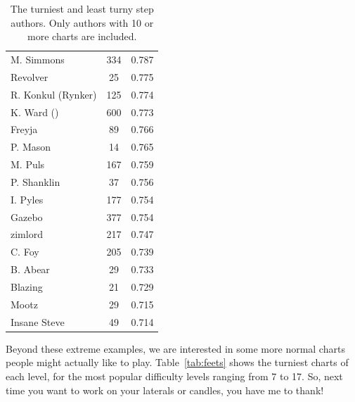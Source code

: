\documentclass[10pt]{sigplanconf}
\begin{document}
\begin{table}[t]
\begin{center}
\begin{tabular}{l|c|c}
		M. Simmons	& 334	& 0.787 \\
		Revolver	& 25	& 0.775 \\
		R. Konkul (Rynker)	& 125	& 0.774 \\
		K. Ward	(\smiley) & 600	& 0.773 \\
		Freyja		& 89	& 0.766 \\
		P. Mason	& 14	& 0.765 \\
		M. Puls		& 167	& 0.759 \\
		P. Shanklin	& 37	& 0.756 \\
		I. Pyles	& 177	& 0.754 \\
		Gazebo		& 377	& 0.754 \\
		zimlord		& 217	& 0.747 \\
		C. Foy		& 205	& 0.739 \\
		B. Abear	& 29	& 0.733 \\
		Blazing		& 21	& 0.729 \\
		Mootz		& 29	& 0.715 \\
		Insane Steve	& 49	& 0.714 \\
	\end{tabular}
	\end{center}
	\caption{The turniest and least turny step authors. Only authors with 10 or more charts are included.}
	\label{tab:artist}
\end{table}
Beyond these extreme examples, we are interested in some more normal charts people might actually like to play.
Table~\ref{tab:feets} shows the turniest charts of each level, for the most popular difficulty levels ranging from 7 to 17.
So, next time you want to work on your laterals or candles, you have me to thank!
\end{document}
